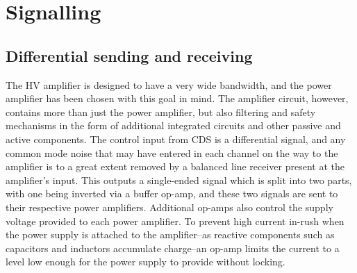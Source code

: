 \section{Signalling}

\subsection{Differential sending and receiving}
The \gls{HV} amplifier is designed to have a very wide bandwidth, and the power amplifier has been chosen with this goal in mind. The amplifier circuit, however, contains more than just the power amplifier, but also filtering and safety mechanisms in the form of additional integrated circuits and other passive and active components. The control input from \gls{CDS} is a differential signal, and any common mode noise that may have entered in each channel on the way to the amplifier is to a great extent removed by a balanced line receiver present at the amplifier's input. This outputs a single-ended signal which is split into two parts, with one being inverted via a buffer op-amp, and these two signals are sent to their respective power amplifiers. Additional op-amps also control the supply voltage provided to each power amplifier. To prevent high current in-rush when the power supply is attached to the amplifier--as reactive components such as capacitors and inductors accumulate charge--an op-amp limits the current to a level low enough for the power supply to provide without locking.

